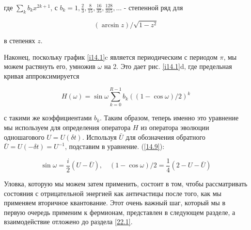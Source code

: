 \documentclass[main.tex]{subfiles}
\begin{document}
где $\sum_k b_k x^{2k+1}$, с $b_k = 1, \frac 2 3, \frac{8}{15}, \frac{16}{35}, \frac{128}{315},\ldots$ - степенной ряд для

\begin{equation}\label{14.8}
	(\arcsin z) / \sqrt{1-z^{2}}
\end{equation}
   
в степенях $z$.

Наконец, поскольку график \ref{i14.1}c является периодическим с периодом $\pi$, мы можем растянуть его, умножив $\omega$ на 2. Это дает рис. \ref{i14.1}d, где предельная кривая аппроксимируется

\begin{equation}\label{14.9}
	H(\omega)=\sin \omega \sum_{k=0}^{R-1} b_{k}((1-\cos \omega) / 2)^{k}
\end{equation}

с такими же коэффициентами $b_k$. Таким образом, теперь именно это уравнение мы используем для определения оператора $H$ из оператора эволюции одношагового $U = U (\delta t)$. Используя $\bar U$ для обозначения обратного $\bar U = U (-\delta t) = U^{-1}$, подставим в уравнение. (\ref{14.9}):

\begin{equation}\label{14.10}
	\sin \omega=\frac{i}{2}(U-\bar{U}), \quad(1-\cos \omega) / 2=\frac{1}{4}(2-U-\bar{U})
\end{equation}

Уловка, которую мы можем затем применить, состоит в том, чтобы рассматривать состояния с отрицательной энергией как  античастицы после того, как мы применяем вторичное квантование. Этот очень важный шаг, который мы в первую очередь применим к фермионам, представлен в следующем разделе, а взаимодействие отложено до раздела \ref{22.1}.
\end{document}
